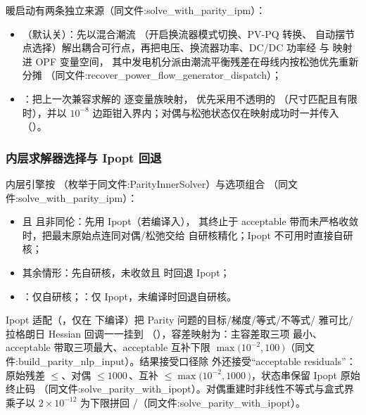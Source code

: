 暖启动有两条独立来源（同文件:solve\_with\_parity\_ipm）：
\begin{itemize}
  \item {}（默认关）：先以混合潮流
        （开启换流器模式切换、PV-PQ 转换、
        自动摆节点选择）解出耦合可行点，再把电压、换流器功率、DC/DC 功率经
         与
         映射进 OPF 变量空间，
        其中发电机分派由潮流平衡残差在母线内按松弛优先重新分摊
        （同文件:recover\_power\_flow\_generator\_dispatch）；
  \item {}：把上一次兼容求解的  逐变量族映射，
        优先采用不透明的 （尺寸匹配且有限时），并以
        $10^{-8}$ 边距钳入界内；对偶与松弛状态仅在映射成功时一并传入
        （）。
\end{itemize}

\subsubsection*{内层求解器选择与 Ipopt 回退}
内层引擎按 （枚举于同文件:ParityInnerSolver）与选项组合
（同文件:solve\_with\_parity\_ipm）：
\begin{itemize}
  \item {} 且  且非同伦：先用 Ipopt（若编译入），
        其终止于 acceptable 带而未严格收敛时，把最末原始点连同对偶/松弛交给
        自研核精化；Ipopt 不可用时直接自研核；
  \item {} 其余情形：先自研核，未收敛且  时回退 Ipopt；
  \item {}：仅自研核；：仅 Ipopt，未编译时回退自研核。
\end{itemize}
Ipopt 适配（，仅在
 下编译）把 Parity 问题的目标/梯度/等式/不等式/
雅可比/拉格朗日 Hessian 回调一一挂到 
（），容差映射为：主容差取三项
最小、acceptable 带取三项最大、acceptable 互补下限 $\max(10^{-2},100\,
$$)$（同文件:build\_parity\_nlp\_input）。结果接受口径除
 外还接受``acceptable residuals''：原始残差
$\le$、对偶 $\le1000\,$、互补
$\le\max(10^{-2},1000\,$$)$，状态串保留 Ipopt 原始终止码
（同文件:solve\_parity\_with\_ipopt）。对偶重建时非线性不等式与盒式界乘子以
$2\times10^{-12}$ 为下限拼回 /（同文件:solve\_parity\_with\_ipopt）。

